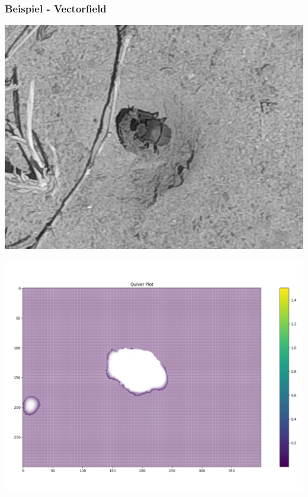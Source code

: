 \begin{frame}
	\frametitle{Beispiel - Vectorfield}
	\begin{minipage}{0.49\textwidth}
		\includegraphics[width=\linewidth]{../Pictures/preferred_1_original.png}
	\end{minipage}
	\begin{minipage}{0.49\textwidth}
		\includegraphics[width=\linewidth]{../Pictures/preferred_1_full.png}
	\end{minipage}
\end{frame}

